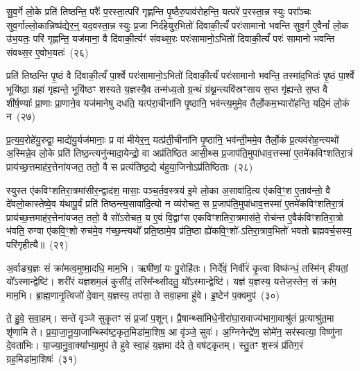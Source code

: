 सु॒व॒र्गे लो॒के प्रति॑ तिष्ठन्ति॒ परैः᳚ प॒रस्ता॒त्परि॑ गृह्णन्ति पृ॒ष्ठैरु॒पाव॑रोहन्ति॒ यत्परे॑ प॒रस्ता॒न्न स्युः परा᳚ञ्चः सुव॒र्गाल्लो॒कान्निष्प॑द्येर॒न्॒ यद॒वस्ता॒न्न स्युः प्र॒जा निर्द॑हेयुर॒भितो॑ दिवाकी॒र्त्यं॑ परः॑सामानो भवन्ति सुव॒र्ग ए॒वैनां᳚ लो॒क उ॑भ॒यतः॒ परि॑ गृह्णन्ति॒ यज॑माना॒ वै दि॑वाकी॒र्त्यꣳ॑ संवथ्स॒रः परः॑सामानो॒\-ऽभितो॑ दिवाकी॒र्त्यं॑ परः॑ सामानो भवन्ति संवथ्स॒र ए॒वोभ॒यतः॑~(२६)\ip

प्रति॑ तिष्ठन्ति पृ॒ष्ठं वै दि॑वाकी॒र्त्यं॑ पा॒र्श्वे परः॑सामानो॒\-ऽभितो॑ दिवाकी॒र्त्यं॑ परः॑सामानो भवन्ति॒ तस्मा॑द॒भितः॑ पृ॒ष्ठं पा॒र्श्वे भूयि॑ष्ठा॒ ग्रहा॑ गृह्यन्ते॒ भूयि॑ष्ठꣳ शस्यते य॒ज्ञस्यै॒व तन्म॑ध्य॒तो ग्र॒न्थं ग्र॑थ्न॒न्त्यवि॑स्रꣳसाय स॒प्त गृ॑ह्यन्ते स॒प्त वै शी॑र्\mbox{}ष॒ण्याः᳚ प्रा॒णाः प्रा॒णाने॒व यज॑मानेषु दधति॒ यत्प॑रा॒चीना॑नि पृ॒ष्ठानि॒ भव॑न्त्य॒मुमे॒व तैर्लो॒कम॒भ्यारो॑हन्ति॒ यदि॒मं लो॒कं न~(२७)\ip

प्र॒त्य॒व॒रोहे॑यु॒रुद्वा॒ माद्ये॑यु॒र्यज॑मानाः॒ प्र वा॑ मीयेर॒न्॒ यत्प्र॑ती॒चीना॑नि पृ॒ष्ठानि॒ भव॑न्ती॒ममे॒व तैर्लो॒कं प्र॒त्यव॑रोह॒न्त्यथो॑ अ॒स्मिन्ने॒व लो॒के प्रति॑ तिष्ठ॒न्त्यनु॑न्मादा॒येन्द्रो॒ वा अप्र॑तिष्ठित आसी॒थ्स प्र॒जा\-प॑ति॒मुपा॑धाव॒त्तस्मा॑ ए॒तमे॑कविꣳशतिरा॒त्रं प्राय॑च्छ॒त्तमाह॑र॒त्तेना॑यजत॒ ततो॒ वै स प्रत्य॑तिष्ठ॒द्ये ब॑हुया॒जिनो\-ऽप्र॑तिष्ठिताः~(२८)\ip

स्युस्त ए॑कविꣳशतिरा॒त्रमा॑सीर॒न्द्वाद॑श॒ मासाः॒ पञ्च॒र्तव॒स्त्रय॑ इ॒मे लो॒का अ॒सावा॑दि॒त्य ए॑कवि॒ꣳ॒श ए॒ताव॑न्तो॒ वै दे॑वलो॒कास्तेष्वे॒व य॑थापू॒र्वं प्रति॑ तिष्ठन्त्य॒सावा॑दि॒त्यो न व्य॑रोचत॒ स प्र॒जा\-प॑ति॒मुपा॑धाव॒त्तस्मा॑ ए॒तमे॑कविꣳशति\-रा॒त्रं प्राय॑च्छ॒त्तमाह॑र॒त्तेना॑यजत॒ ततो॒ वै सो॑\-ऽरोचत॒ य ए॒वं वि॒द्वाꣳ॑स एकविꣳशतिरा॒त्रमास॑ते॒ रोच॑न्त ए॒वैक॑विꣳशतिरा॒त्रो भ॑वति॒ रुग्वा ए॑कवि॒ꣳ॒शो रुच॑मे॒व ग॑च्छ॒न्त्यथो᳚ प्रति॒ष्ठामे॒व प्र॑ति॒ष्ठा ह्ये॑कवि॒ꣳ॒शो॑-\-ऽतिरा॒त्राव॒भितो॑ भवतो ब्रह्मवर्च॒सस्य॒ परि॑गृहीत्यै॥~(२९)\ip

{\anuvakamend[{गृ॒ह्ण॒न्ति॒ दि॒वा॒की॒र्त्ये॑नै॒वोभ॒यतो॒ नाप्र॑तिष्ठिता॒ आस॑त॒ एक॑विꣳशतिश्च}]}%

अ॒र्वाङ्य॒ज्ञः सं क्रा॑मत्व॒मुष्मा॒दधि॒ माम॒भि। ऋषी॑णां॒ यः पु॒रोहि॑तः। निर्दे॑वं॒ निर्वी॑रं कृ॒त्वा विष्क॑न्धं॒ तस्मि॑न् हीयतां॒ यो᳚\-ऽस्मान्द्वेष्टि॑। शरी॑रं यज्ञशम॒लं कुसी॑दं॒ तस्मि᳚न्थ्सीदतु॒ यो᳚\-ऽस्मान्द्वेष्टि॑। यज्ञ॑ य॒ज्ञस्य॒ यत्तेज॒स्तेन॒ सं क्रा॑म॒ माम॒भि। ब्रा॒ह्म॒णानृ॒त्विजो॑ दे॒वान् य॒ज्ञस्य॒ तप॑सा॒ ते सवा॒हमा हु॑वे। इ॒ष्टेन॑ प॒क्वमुप॑~(३०)\ip

ते॒ हु॒वे॒ स॒वा॒हम्। सन्ते॑ वृञ्जे सुकृ॒तꣳ सं प्र॒जां प॒शून्। प्रै॒षान्थ्सा॑मिधे॒नीरा॑घा॒रावाज्य॑भागा॒वाश्रु॑तं प्र॒त्याश्रु॑त॒मा शृ॑णामि ते। प्र॒या॒जा॒नू॒या॒जान्थ्स्वि॑ष्ट॒कृत॒मिडा॑मा॒शिष॒ आ वृ॑ञ्जे॒ सुवः॑। अ॒ग्निनेन्द्रे॑ण॒ सोमे॑न॒ सर॑स्वत्या॒ विष्णु॑ना दे॒वता॑भिः। या॒ज्या॒नु॒वा॒क्या᳚भ्या॒मुप॑ ते हुवे स्वा॒हं य॒ज्ञमा द॑दे ते॒ वष॑ट्कृतम्। स्तु॒तꣳ श॒स्त्रं प्र॑तिग॒रं ग्रह॒मिडा॑मा॒शिषः॑~(३१)\ip

